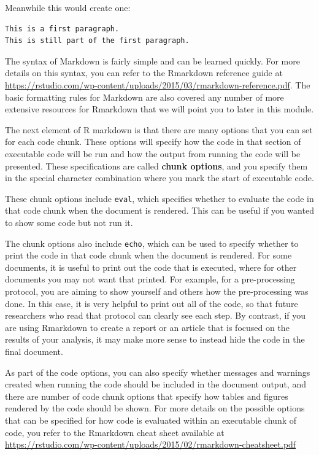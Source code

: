 \documentclass[]{tufte-book}
\begin{document}
Meanwhile this would create one:

\begin{verbatim}
This is a first paragraph.
This is still part of the first paragraph.
\end{verbatim}

The syntax of Markdown is fairly simple and can be learned quickly. For more
details on this syntax, you can refer to the Rmarkdown reference guide at
\url{https://rstudio.com/wp-content/uploads/2015/03/rmarkdown-reference.pdf}. The
basic formatting rules for Markdown are also covered any number of more
extensive resources for Rmarkdown that we will point you to later in this
module.

The next element of R markdown is that there are many options that you can set
for each code chunk. These options will specify how the code in that section of
executable code will be run and how the output from running the code will be
presented. These specifications are called \textbf{chunk options}, and you specify
them in the special character combination where you mark the start of executable
code.

These chunk options include \texttt{eval}, which specifies whether to evaluate the code
in that code chunk when the document is rendered. This can be useful if you
wanted to show some code but not run it.

The chunk options also include \texttt{echo}, which can be used to specify whether to
print the code in that code chunk when the document is rendered. For some
documents, it is useful to print out the code that is executed, where for other
documents you may not want that printed. For example, for a pre-processing
protocol, you are aiming to show yourself and others how the pre-processing was
done. In this case, it is very helpful to print out all of the code, so that
future researchers who read that protocol can clearly see each step. By
contrast, if you are using Rmarkdown to create a report or an article that is
focused on the results of your analysis, it may make more sense to instead hide
the code in the final document.

As part of the code options, you can also specify whether messages and warnings
created when running the code should be included in the document output, and
there are number of code chunk options that specify how tables and figures
rendered by the code should be shown. For more details on the possible options
that can be specified for how code is evaluated within an executable chunk of
code, you refer to the Rmarkdown cheat sheet available at
\url{https://rstudio.com/wp-content/uploads/2015/02/rmarkdown-cheatsheet.pdf}
\end{document}
